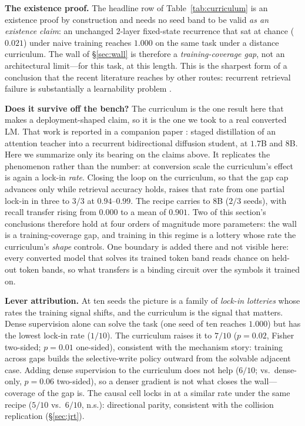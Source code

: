 \documentclass{article}
\begin{document}
\textbf{The existence proof.} The headline row of Table~\ref{tab:curriculum} is an existence proof by construction and needs no seed band to be valid \emph{as an existence claim}: an unchanged 2-layer fixed-state recurrence that sat at chance ($0.021$) under naive training reaches $1.000$ on the same task under a distance curriculum. The wall of \S\ref{sec:wall} is therefore a \emph{training-coverage gap}, not an architectural limit---for this task, at this length. This is the sharpest form of a conclusion that the recent literature reaches by other routes: recurrent retrieval failure is substantially a learnability problem \citep{okpekpe2025recall,lengthgen2025,blouir2024birdie}.

\textbf{Does it survive off the bench?} The curriculum is the one result here that makes a deployment-shaped claim, so it is the one we took to a real converted LM. That work is reported in a companion paper \citep{dreaminggoose}: staged distillation of an attention teacher into a recurrent bidirectional diffusion student, at $1.7$B and $8$B. Here we summarize only its bearing on the claims above. It replicates the phenomenon rather than the number: at conversion scale the curriculum's effect is again a lock-in \emph{rate}. Closing the loop on the curriculum, so that the gap cap advances only while retrieval accuracy holds, raises that rate from one partial lock-in in three to $3/3$ at $0.94$--$0.99$. The recipe carries to $8$B ($2/3$ seeds), with recall transfer rising from $0.000$ to a mean of $0.901$. Two of this section's conclusions therefore hold at four orders of magnitude more parameters: the wall is a training-coverage gap, and training in this regime is a lottery whose rate the curriculum's \emph{shape} controls. One boundary is added there and not visible here: every converted model that solves its trained token band reads chance on held-out token bands, so what transfers is a binding circuit over the symbols it trained on.

\textbf{Lever attribution.} At ten seeds the picture is a family of \emph{lock-in lotteries} whose rates the training signal shifts, and the curriculum is the signal that matters. Dense supervision alone can solve the task (one seed of ten reaches $1.000$) but has the lowest lock-in rate ($1/10$). The curriculum raises it to $7/10$ ($p{=}0.02$, Fisher two-sided; $p{=}0.01$ one-sided), consistent with the mechanism story: training across gaps builds the selective-write policy outward from the solvable adjacent case. Adding dense supervision to the curriculum does not help ($6/10$; vs.\ dense-only, $p{=}0.06$ two-sided), so a denser gradient is not what closes the wall---coverage of the gap is. The causal cell locks in at a similar rate under the same recipe ($5/10$ vs.\ $6/10$, n.s.): directional parity, consistent with the collision replication (\S\ref{sec:jrt}).
\end{document}
